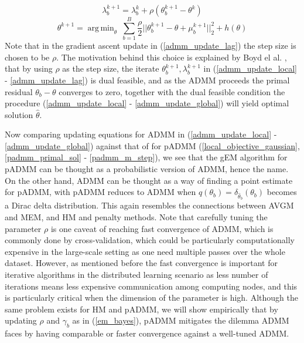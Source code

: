 \documentclass{article}
\DeclareMathOperator*{\argmin}{arg\,min}
\newcommand{\1}[0]{\ensuremath{\boldsymbol{1}}\xspace}
\begin{document}
\begin{equation}\label{admm_update_lag}
\textstyle \lambda_b^{k+1} = \lambda_b^k + \rho(\theta_b^{k+1} - \theta^{k})
\end{equation}
\begin{equation}\label{admm_update_global}
\theta^{k+1} = \argmin_\theta ~\textstyle\sum_{b=1}^B\frac{\rho}{2}||\theta_b^{k+1} - \theta + \mu_b^{k+1}||^2_2 + h(\theta)
\end{equation}
Note that in the gradient ascent update in (\ref{admm_update_lag}) the step size is chosen to be $\rho$. The motivation behind this choice is explained by Boyd el al. , that by using $\rho$ as the step size, the iterate
$\theta_b^{k+1}, \lambda_b^{k+1}$ in (\ref{admm_update_local} - \ref{admm_update_lag}) is dual feasible, and as the ADMM proceeds the primal residual $\theta_b -\theta$ converges to zero, together with the dual feasible condition the procedure (\ref{admm_update_local} - \ref{admm_update_global}) will yield optimal solution $\hat\theta$. 

Now comparing updating equations for ADMM in (\ref{admm_update_local} - \ref{admm_update_global}) against that of for pADMM (\ref{local_objective_gaussian}, \ref{padmm_primal_sol} - \ref{padmm_m_step}), we see that the gEM algorithm for pADMM can be thought as a probabilistic version of ADMM, hence the name. On the other hand, ADMM can be thought as a way of finding a point estimate for pADMM, with pADMM reduces to ADMM when $q(\theta_b) = \delta_{\hat\theta_b}(\theta_b)$ becomes a Dirac delta distribution. This again resembles the connections between AVGM and MEM, and HM and penalty methods. Note that carefully tuning the parameter $\rho$ is one caveat of reaching fast convergence of ADMM, which is commonly done by cross-validation, which could be particularly computationally expensive in the large-scale setting as one need multiple passes over the whole dataset. However, as mentioned before the fast convergence is important for iterative algorithms in the distributed learning scenario as less number of iterations means less expensive communication among computing nodes, and this is particularly critical when the dimension of the parameter is high. Although the same problem exists for HM and pADMM, we will show empirically that by updating $\rho$ and $\gamma_b$ as in (\ref{em_bayes}), pADMM mitigates the dilemma ADMM faces by having comparable or faster convergence against a well-tuned ADMM.
 
\end{document}
